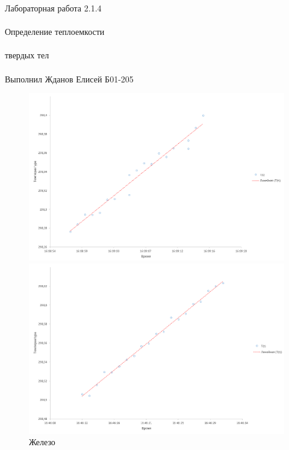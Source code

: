 \documentclass{astroedu-lab}
\begin{document}
\begin{problem}{\huge Лабораторная работа 2.1.4\\\\Определение теплоемкости\\\\твердых тел\\\\Выполнил Жданов Елисей Б01-205}
\begin{figure}
\begin{center}
\begin{minipage}[h]{0.48\linewidth}
				\caption{Пустой калориметр 2}
				\label{ris:dR_dt(r)_for_steel}
			\end{minipage}
		\end{center}
		\begin{center}
			\begin{minipage}[h]{0.48\linewidth}
				\includegraphics[width=1\linewidth]{картинки/2023-02-11_22-52-18.png}
				\caption{Алюминий} 
				\label{ris:dR_dt(r)_for_latun'} %
			\end{minipage}
		\hfill
			\begin{minipage}[h]{0.48\linewidth}
				\includegraphics[width=1\linewidth]{картинки/2023-02-11_22-53-10.png}
				\caption{Железо}
				\label{ris:dR_dt(r)_for_aluminium}
			\end{minipage}
		\end{center}
\end{figure}


\end{problem}
\end{document}
